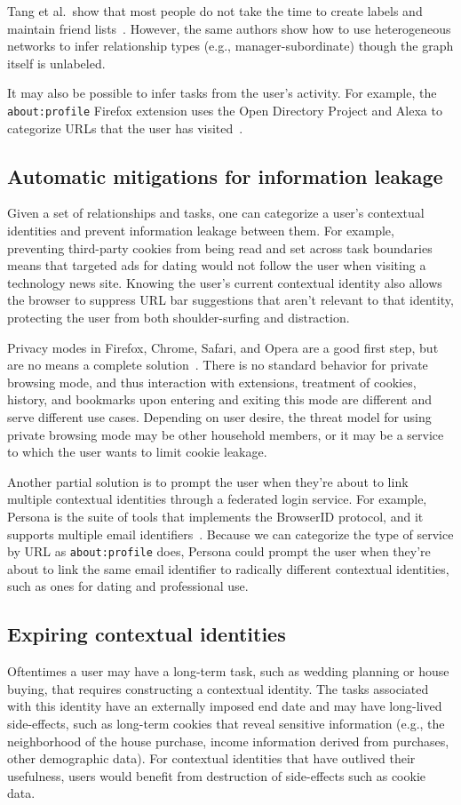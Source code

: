 \documentclass[10pt, conference, compsocconf]{IEEEtran}
\begin{document}
Tang et al.~show that most people do not take the time to create labels and
maintain friend lists~\cite{tang}. However, the same authors show how to use
heterogeneous networks to infer relationship types (e.g., manager-subordinate)
though the graph itself is unlabeled.

It may also be possible to infer tasks from the user's activity. For example,
the \texttt{about:profile} Firefox extension uses the Open Directory Project
and Alexa to categorize URLs that the user has visited~\cite{aboutprofile}.

\subsection{Automatic mitigations for information leakage}
Given a set of relationships and tasks, one can categorize a user's
contextual identities and prevent information leakage between them.  For
example, preventing third-party cookies from being read and set across task
boundaries means that targeted ads for dating would not follow the user when
visiting a technology news site. Knowing the user's current contextual identity
also allows the browser to suppress URL bar suggestions that aren't relevant to
that identity, protecting the user from both shoulder-surfing and distraction.

Privacy modes in Firefox, Chrome, Safari, and Opera are a good first step, but
are no means a complete solution~\cite{ABBJ10}. There is no standard behavior
for private browsing mode, and thus interaction with extensions, treatment of
cookies, history, and bookmarks upon entering and exiting this mode are
different and serve different use cases. Depending on user desire, the threat
model for using private browsing mode may be other household members, or it may
be a service to which the user wants to limit cookie leakage.

Another partial solution is to prompt the user when they're about to link
multiple contextual identities through a federated login service. For example,
Persona is the suite of tools that implements the BrowserID protocol, and it
supports multiple email identifiers~\cite{browserid}.
Because we can categorize the type of service by URL
as \texttt{about:profile} does, Persona could prompt the user when they're about
to link the same email identifier to radically different contextual identities,
such as ones for dating and professional use.

\subsection{Expiring contextual identities}
Oftentimes a user may have a long-term task, such as wedding planning or house
buying, that requires constructing a contextual identity. The tasks associated
with this identity have an externally imposed end date and may have long-lived
side-effects, such as long-term cookies that reveal sensitive information
(e.g., the neighborhood of the house purchase, income information derived from
purchases, other demographic data). For contextual identities that have
outlived their usefulness, users would benefit from destruction of side-effects
such as cookie data.
\end{document}
